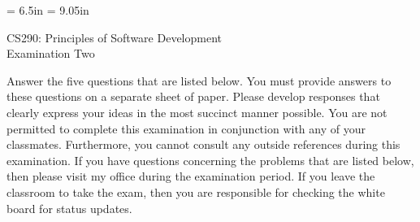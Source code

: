 \textwidth = 6.5in
\textheight = 9.05in
\topmargin 0.0in
\oddsidemargin 0.0in
\evensidemargin 0.0in


\setcounter{secnumdepth}{3}
\setcounter{tocdepth}{3}

        
\def\widow#1{\vskip #1\vbadness10000\penalty-200\vskip-#1}


\def\littlesection#1{
\widow{2cm}
\vskip 0.5cm
\noindent{\bf #1}
\vskip 0.1cm
\noindent
}


\newdimen\tmpdim
\long{}

\renewcommand{\baselinestretch}{1.2}    %
\newtheorem{principle}{Principle}
\newtheorem{definition}{Definition}



\def\widow#1{\vskip #1\vbadness10000\penalty-200\vskip-#1}

\begin{center}

CS290: Principles of Software Development \\
Examination Two \\

\end{center}

\noindent Answer the five questions that are listed below.  You must provide answers to these questions on a separate
sheet of paper.  Please develop responses that clearly express your ideas in the most succinct manner possible.  You are
not permitted to complete this examination in conjunction with any of your classmates.  Furthermore, you cannot consult
any outside references during this examination.  If you have questions concerning the problems that are listed below,
then please visit my office during the examination period.  If you leave the classroom to take the exam, then you are
responsible for checking the white board for status updates.

